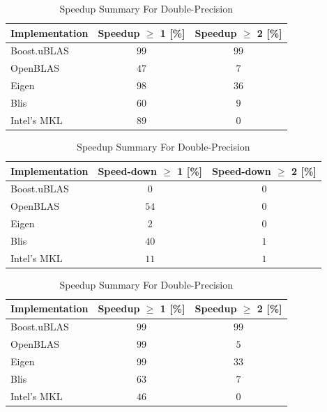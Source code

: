 \begin{table}[ht]
    \centering
    \caption{Speedup Summary For Single-Precision}
    \begin{tabular}{|l|c|c|}
        \hline
        \textbf{Implementation} & \textbf{Speedup $\geq$ 1 [\%]} & \textbf{Speedup $\geq$ 2 [\%]}\\
        \hline
        Boost.uBLAS & $99$ & $99$ \\
        \hline
        OpenBLAS    & $47$ & $7$ \\
        \hline
        Eigen       & $98$ & $36$ \\
        \hline
        Blis        & $60$ & $9$ \\
        \hline
        Intel's MKL & $89$ & $0$ \\
        \hline
    \end{tabular}
    
    \begin{tabular}{|l|c|c|}
        \hline
        \textbf{Implementation} & \textbf{Speed-down $\geq$ 1 [\%]} & \textbf{Speed-down $\geq$ 2 [\%]}\\
        \hline
        Boost.uBLAS & $0$ & $0$ \\
        \hline
        OpenBLAS    & $54$ & $0$ \\
        \hline
        Eigen       & $2$ & $0$ \\
        \hline
        Blis        & $40$ & $1$ \\
        \hline
        Intel's MKL & $11$ & $1$ \\
        \hline
    \end{tabular}
    
    \vspace*{1 cm}

    \centering
    \caption{Speedup Summary For Double-Precision}
    \begin{tabular}{|l|c|c|}
        \hline
        \textbf{Implementation} & \textbf{Speedup $\geq$ 1 [\%]} & \textbf{Speedup $\geq$ 2 [\%]}\\
        \hline
        Boost.uBLAS & $99$ & $99$ \\
        \hline
        OpenBLAS    & $99$ & $5$ \\
        \hline
        Eigen       & $99$ & $33$ \\
        \hline
        Blis        & $63$ & $7$ \\
        \hline
        Intel's MKL & $46$ & $0$ \\
        \hline
    \end{tabular}
    

\end{table}
